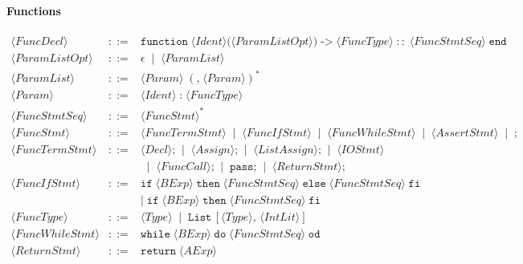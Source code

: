 \documentclass{article}
\begin{document}
\paragraph{Functions}
\[
\begin{array}{rcl}
\langle \mathit{FuncDecl} \rangle
&::=&
\mathtt{function}\;\langle \mathit{Ident} \rangle
\texttt{(}\langle \mathit{ParamListOpt} \rangle\texttt{)}
\;\texttt{->}\;
\langle \mathit{FuncType} \rangle\;
::\;
\langle \mathit{FuncStmtSeq} \rangle\;
\mathtt{end} \\[6pt]

\langle \mathit{ParamListOpt} \rangle
&::=&
\epsilon
\;\mid\;
\langle \mathit{ParamList} \rangle \\[4pt]

\langle \mathit{ParamList} \rangle
&::=&
\langle \mathit{Param} \rangle\;(\texttt{,}\;\langle \mathit{Param} \rangle)^* \\[4pt]

\langle \mathit{Param} \rangle
&::=&
\langle \mathit{Ident} \rangle\;\texttt{:}\;\langle \mathit{FuncType} \rangle 
\\[4pt]

\langle \mathit{FuncStmtSeq} \rangle
&::=&
\langle \mathit{FuncStmt} \rangle^* \\[4pt]

\langle \mathit{FuncStmt} \rangle
&::=&
\langle \mathit{FuncTermStmt} \rangle
\;\mid\;
\langle \mathit{FuncIfStmt} \rangle
\;\mid\;
\langle \mathit{FuncWhileStmt} \rangle
\;\mid\;
\langle \mathit{AssertStmt} \rangle
\;\mid\;
\texttt{;} \\[4pt]

\langle \mathit{FuncTermStmt} \rangle
&::=&
\langle \mathit{Decl} \rangle\texttt{;}
\;\mid\;
\langle \mathit{Assign} \rangle\texttt{;}
\;\mid\;
\langle \mathit{ListAssign} \rangle\texttt{;}
\;\mid\;
\langle \mathit{IOStmt} \rangle \\[4pt]
&& \;\mid\;
\langle \mathit{FuncCall} \rangle\texttt{;}
\;\mid\;
\mathtt{pass}\texttt{;}
\;\mid\;
\langle \mathit{ReturnStmt} \rangle\texttt{;}
\\[4pt]

\langle \mathit{FuncIfStmt} \rangle
&::=&
\mathtt{if}\;\langle \mathit{BExp} \rangle\;\mathtt{then}\;\langle \mathit{FuncStmtSeq} \rangle\;\mathtt{else}\;\langle \mathit{FuncStmtSeq} \rangle\;\mathtt{fi} \\
&& \mid\;
\mathtt{if}\;\langle \mathit{BExp} \rangle\;\mathtt{then}\;\langle \mathit{FuncStmtSeq} \rangle\;\mathtt{fi} \\[4pt]

\langle \mathit{FuncType} \rangle
&::=&
\langle \mathit{Type} \rangle
\;\mid\;
\mathtt{List}\,[\langle \mathit{Type} \rangle,\, \langle \mathit{IntLit} \rangle] \\[4pt]

\langle \mathit{FuncWhileStmt} \rangle
&::=&
\mathtt{while}\;\langle \mathit{BExp} \rangle\;\mathtt{do}\;\langle \mathit{FuncStmtSeq} \rangle\;\mathtt{od} \\[4pt]

\langle \mathit{ReturnStmt} \rangle
&::=&
\mathtt{return}\;\langle \mathit{AExp} \rangle

\end{array}
\]
\end{document}
